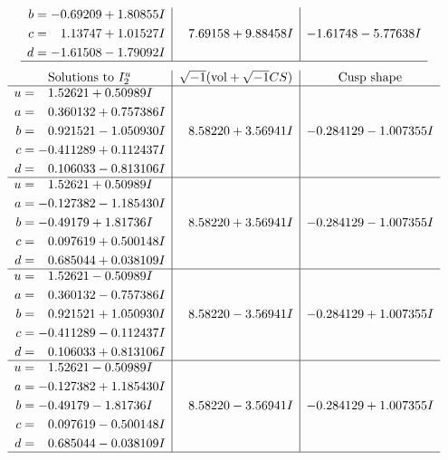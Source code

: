 \documentclass[1p]{elsarticle_modified}
\theoremstyle{definition}
\newcommand{\I}{\sqrt{-1}}
\begin{document}
$$\begin{array}{c|c|c}
\begin{aligned}
b &= -0.69209 + 1.80855 I \\
c &= \phantom{-}1.13747 + 1.01527 I \\
d &= -1.61508 - 1.79092 I\end{aligned}
 & \phantom{-}7.69158 + 9.88458 I & -1.61748 - 5.77638 I\\
 \hline 
 \end{array}$$\newpage$$\begin{array}{c|c|c}  
\text{Solutions to }I^u_{2}& \I (\text{vol} + \sqrt{-1}CS) & \text{Cusp shape}\\
 \hline 
\begin{aligned}
u &= \phantom{-}1.52621 + 0.50989 I \\
a &= \phantom{-}0.360132 + 0.757386 I \\
b &= \phantom{-}0.921521 - 1.050930 I \\
c &= -0.411289 + 0.112437 I \\
d &= \phantom{-}0.106033 - 0.813106 I\end{aligned}
 & \phantom{-}8.58220 + 3.56941 I & -0.284129 - 1.007355 I \\ \hline\begin{aligned}
u &= \phantom{-}1.52621 + 0.50989 I \\
a &= -0.127382 - 1.185430 I \\
b &= -0.49179 + 1.81736 I \\
c &= \phantom{-}0.097619 + 0.500148 I \\
d &= \phantom{-}0.685044 + 0.038109 I\end{aligned}
 & \phantom{-}8.58220 + 3.56941 I & -0.284129 - 1.007355 I \\ \hline\begin{aligned}
u &= \phantom{-}1.52621 - 0.50989 I \\
a &= \phantom{-}0.360132 - 0.757386 I \\
b &= \phantom{-}0.921521 + 1.050930 I \\
c &= -0.411289 - 0.112437 I \\
d &= \phantom{-}0.106033 + 0.813106 I\end{aligned}
 & \phantom{-}8.58220 - 3.56941 I & -0.284129 + 1.007355 I \\ \hline\begin{aligned}
u &= \phantom{-}1.52621 - 0.50989 I \\
a &= -0.127382 + 1.185430 I \\
b &= -0.49179 - 1.81736 I \\
c &= \phantom{-}0.097619 - 0.500148 I \\
d &= \phantom{-}0.685044 - 0.038109 I\end{aligned}
 & \phantom{-}8.58220 - 3.56941 I & -0.284129 + 1.007355 I\\
 \hline 
 \end{array}$$\newpage\newpage\renewcommand{\arraystretch}{1}
\end{document}
